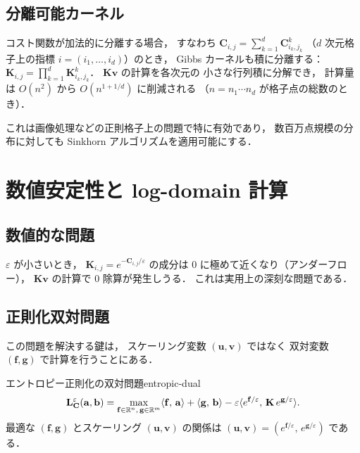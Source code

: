 \subsection{分離可能カーネル}\label{subsec:separable}

コスト関数が加法的に分離する場合，
すなわち $\mathbf{C}_{i,j} = \sum_{k=1}^d \mathbf{C}^k_{i_k, j_k}$
（$d$ 次元格子上の指標 $i = (i_1, \ldots, i_d)$）のとき，
Gibbs カーネルも積に分離する：
$\mathbf{K}_{i,j} = \prod_{k=1}^d \mathbf{K}^k_{i_k, j_k}$．
$\mathbf{K}\mathbf{v}$ の計算を各次元の
小さな行列積に分解でき，
計算量は $O(n^2)$ から $O(n^{1+1/d})$ に削減される
（$n = n_1 \cdots n_d$ が格子点の総数のとき）．

これは画像処理などの正則格子上の問題で特に有効であり，
数百万点規模の分布に対しても
Sinkhorn アルゴリズムを適用可能にする．


\section{数値安定性と log-domain 計算}\label{sec:log-domain}

\subsection{数値的な問題}\label{subsec:numerical-issue}

$\varepsilon$ が小さいとき，
$\mathbf{K}_{i,j} = e^{-\mathbf{C}_{i,j}/\varepsilon}$ の成分は
$0$ に極めて近くなり（アンダーフロー），
$\mathbf{K}\mathbf{v}$ の計算で $0$ 除算が発生しうる．
これは実用上の深刻な問題である．

\subsection{正則化双対問題}\label{subsec:entropic-dual}

この問題を解決する鍵は，
スケーリング変数 $(\mathbf{u}, \mathbf{v})$ ではなく
双対変数 $(\mathbf{f}, \mathbf{g})$
で計算を行うことにある．

\begin{proposition}{エントロピー正則化の双対問題}{entropic-dual}
\begin{equation}\label{eq:entropic-dual}
  \mathbf{L}^\varepsilon_{\mathbf{C}}(\mathbf{a}, \mathbf{b})
  = \max_{\mathbf{f} \in \mathbb{R}^n,\, \mathbf{g} \in \mathbb{R}^m}
  \langle \mathbf{f},\, \mathbf{a} \rangle + \langle \mathbf{g},\, \mathbf{b} \rangle
  - \varepsilon \langle e^{\mathbf{f}/\varepsilon},\, \mathbf{K}\, e^{\mathbf{g}/\varepsilon} \rangle.
\end{equation}
最適な $(\mathbf{f}, \mathbf{g})$ とスケーリング
$(\mathbf{u}, \mathbf{v})$ の関係は
$(\mathbf{u}, \mathbf{v}) = (e^{\mathbf{f}/\varepsilon},\, e^{\mathbf{g}/\varepsilon})$
である．
\end{proposition}

